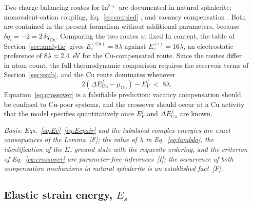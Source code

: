\documentclass[11pt,a4paper]{article}
\begin{document}
Two charge-balancing routes for $\mathrm{In^{3+}}$ are documented in natural
sphalerite: monovalent-cation coupling, Eq.~\eqref{eq:coupled}
\citep{johan1988}, and vacancy compensation \citep{trofimov2020}. Both are contained in the present formalism without additional
parameters, because $\delta q_\square = -2 = 2\,\delta q_{\mathrm{Cu}}$.
Comparing the two routes at fixed In content, the table of
Section~\ref{sec:analytic} gives $E_c^{(\mathrm{Cu})} = 8\lambda$ against
$E_c^{(\square)} = 16\lambda$, an electrostatic preference of
$8\lambda \approx 2.4$~eV for the Cu-compensated route. Since the routes differ
in atom count, the full thermodynamic comparison requires the reservoir terms of
Section~\ref{sec:esub}, and the Cu route dominates whenever
\begin{equation}
2\left( \Delta E^{f}_{\mathrm{Cu}} - \mu_{\mathrm{Cu}} \right) - E^{f}_{V}
\;<\; 8\lambda .
\label{eq:crossover}
\end{equation}
Equation~\eqref{eq:crossover} is a falsifiable prediction: vacancy compensation
should be confined to Cu-poor systems, and the crossover should occur at a Cu
activity that the model specifies quantitatively once $E^f_V$ and
$\Delta E^f_{\mathrm{Cu}}$ are known.

\textit{Basis: Eqs.~\eqref{eq:Ec}--\eqref{eq:Ecpair} and the tabulated complex
energies are exact consequences of the Lemma~[F]; the value of $\lambda$ in
Eq.~\eqref{eq:lambda}, the identification of the $E_c$ ground state with the
roquesite ordering, and the criterion of Eq.~\eqref{eq:crossover} are
parameter-free inferences~[I]; the occurrence of both compensation mechanisms in
natural sphalerite is an established fact~[F].}

\subsection{Elastic strain energy, \texorpdfstring{$E_s$}{Es}}
\end{document}
